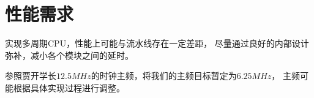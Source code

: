 \section{性能需求}
    实现多周期CPU，性能上可能与流水线存在一定差距，
    尽量通过良好的内部设计弥补，减小各个模块之间的延时。

    参照贾开学长$12.5MHz$的时钟主频，将我们的主频目标暂定为$6.25MHz$，
    主频可能根据具体实现过程进行调整。
